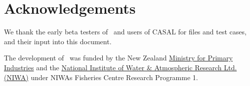 \section{Acknowledgements\label{sec:acknowledgements}}

We thank the early beta testers of \CNAME\ and users of CASAL \citep{1388} for files and test cases, and their input into this document.

The development of \CNAME\ was funded by the New Zealand \href{http://www.mpi.govt.nz}{Ministry for Primary Industries} and the \href{http://www.niwa.co.nz}{National Institute of Water \& Atmospheric Research Ltd. (NIWA)} under NIWAs Fisheries Centre Research Programme 1. 
